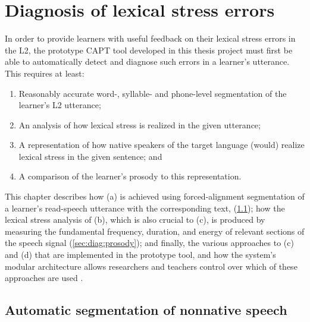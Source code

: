 %
%
\chapter{Diagnosis of lexical stress errors}
\label{chap:diagnosis}


In order to provide learners with useful feedback on their lexical stress errors in the L2, 
the prototype CAPT tool developed in this thesis project 
must first be able to automatically detect and diagnose such errors in a learner's utterance. This requires at least:
\begin{enumerate}[label=(\alph*)]
\item Reasonably accurate word-, syllable- and phone-level segmentation of the learner's L2 utterance; 
\item %
An analysis of how lexical stress is realized in the
given
utterance;
\item A representation of how native speakers of the target language (would) realize lexical stress in the given sentence; and
\item %
A comparison of the learner's prosody to this representation. 
\end{enumerate}

This chapter describes 
%
how (a) is achieved using
 forced-alignment segmentation of a learner's read-speech utterance with the corresponding text, 
 (\cref{sec:diag:segmentation}); 
 how the lexical stress analysis of (b), which is also crucial to (c), is produced by measuring the fundamental frequency, duration, and energy of relevant sections of the speech signal (\cref{sec:diag:prosody}); 
 and finally, the various approaches to (c) and (d) that are implemented in the prototype tool, and how the system's modular architecture allows researchers and teachers control over which of these approaches are used .



\section{Automatic segmentation of nonnative speech}
\label{sec:diag:segmentation}

